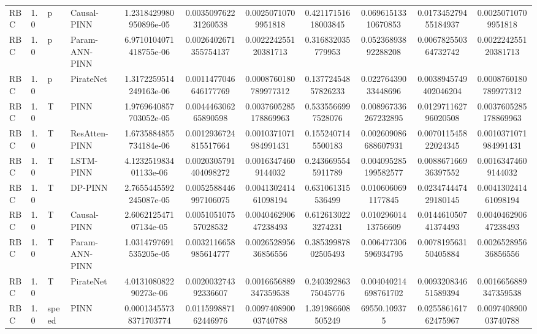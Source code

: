 \begin{landscape}
\begin{table}[p]
{\begin{tabular}{llllccccccc}
RBC &    1.0 &     p &    Causal-PINN & 1.2318429980950896e-05 &   0.003509762231260538 &    0.00250710709951818 &  0.42117151618003845 &   0.06961513310670853 &  0.017345279455184937 &    0.00250710709951818 \\
RBC &    1.0 &     p & Param-ANN-PINN & 6.9710104071418755e-06 &  0.0026402671355754137 &   0.002224255120381713 &    0.316832035779953 &   0.05236893892288208 &  0.006782550364732742 &   0.002224255120381713 \\
RBC &    1.0 &     p &      PirateNet & 1.3172259514249163e-06 &  0.0011477046646177769 &  0.0008760180789977312 &  0.13772454857826233 &   0.02276439033448696 & 0.0038945749402046204 &  0.0008760180789977312 \\
RBC &    1.0 &     T &           PINN & 1.9769640857703052e-05 &   0.004446306265890598 &  0.0037605285178869963 &   0.5335566997528076 &  0.008967336267232895 &  0.012971162796020508 &  0.0037605285178869963 \\
RBC &    1.0 &     T &  ResAtten-PINN & 1.6735884855734184e-06 &  0.0012936724815517664 &  0.0010371071984991431 &   0.1552407145500183 &  0.002609086688607931 &  0.007011545822024345 &  0.0010371071984991431 \\
RBC &    1.0 &     T &      LSTM-PINN &  4.123251983401133e-06 &  0.0020305791404098272 &    0.00163474609144032 &   0.2436695545911789 &  0.004095285199582577 &  0.008867166936397552 &    0.00163474609144032 \\
RBC &    1.0 &     T &        DP-PINN & 2.7655445592245087e-05 &  0.0052588446997106075 &   0.004130241461098194 &    0.631061315536499 &    0.0106060691177845 &  0.023474447429180145 &   0.004130241461098194 \\
RBC &    1.0 &     T &    Causal-PINN &  2.606212547107134e-05 &   0.005105107557028532 &   0.004046290647238493 &   0.6126130223274231 &   0.01029601413756609 &  0.014461050741374493 &   0.004046290647238493 \\
RBC &    1.0 &     T & Param-ANN-PINN & 1.0314797691535205e-05 &  0.0032116658985614777 &   0.002652895636856556 &  0.38539987802505493 &  0.006477306596934795 &  0.007819563150405884 &   0.002652895636856556 \\
RBC &    1.0 &     T &      PirateNet &  4.013108082290273e-06 &   0.002003274392336607 &  0.0016656889347359538 &  0.24039286375045776 &  0.004040214698761702 &  0.009320834651589394 &  0.0016656889347359538 \\
RBC &    1.0 & speed &           PINN & 0.00013455738371703774 &   0.011599887162446976 &   0.009740890003740788 &    1.391986608505249 &          69550.109375 &  0.025586161762475967 &   0.009740890003740788 \\

\end{tabular}}
\end{table}
\end{landscape}
